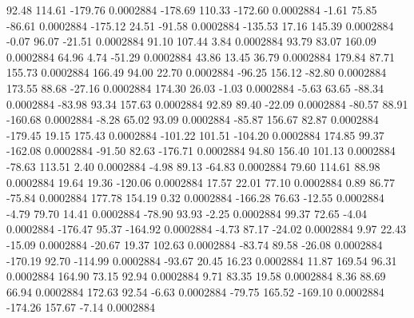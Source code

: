        92.48      114.61     -179.76     0.0002884
     -178.69      110.33     -172.60     0.0002884
       -1.61       75.85      -86.61     0.0002884
     -175.12       24.51      -91.58     0.0002884
     -135.53       17.16      145.39     0.0002884
       -0.07       96.07      -21.51     0.0002884
       91.10      107.44        3.84     0.0002884
       93.79       83.07      160.09     0.0002884
       64.96        4.74      -51.29     0.0002884
       43.86       13.45       36.79     0.0002884
      179.84       87.71      155.73     0.0002884
      166.49       94.00       22.70     0.0002884
      -96.25      156.12      -82.80     0.0002884
      173.55       88.68      -27.16     0.0002884
      174.30       26.03       -1.03     0.0002884
       -5.63       63.65      -88.34     0.0002884
      -83.98       93.34      157.63     0.0002884
       92.89       89.40      -22.09     0.0002884
      -80.57       88.91     -160.68     0.0002884
       -8.28       65.02       93.09     0.0002884
      -85.87      156.67       82.87     0.0002884
     -179.45       19.15      175.43     0.0002884
     -101.22      101.51     -104.20     0.0002884
      174.85       99.37     -162.08     0.0002884
      -91.50       82.63     -176.71     0.0002884
       94.80      156.40      101.13     0.0002884
      -78.63      113.51        2.40     0.0002884
       -4.98       89.13      -64.83     0.0002884
       79.60      114.61       88.98     0.0002884
       19.64       19.36     -120.06     0.0002884
       17.57       22.01       77.10     0.0002884
        0.89       86.77      -75.84     0.0002884
      177.78      154.19        0.32     0.0002884
     -166.28       76.63      -12.55     0.0002884
       -4.79       79.70       14.41     0.0002884
      -78.90       93.93       -2.25     0.0002884
       99.37       72.65       -4.04     0.0002884
     -176.47       95.37     -164.92     0.0002884
       -4.73       87.17      -24.02     0.0002884
        9.97       22.43      -15.09     0.0002884
      -20.67       19.37      102.63     0.0002884
      -83.74       89.58      -26.08     0.0002884
     -170.19       92.70     -114.99     0.0002884
      -93.67       20.45       16.23     0.0002884
       11.87      169.54       96.31     0.0002884
      164.90       73.15       92.94     0.0002884
        9.71       83.35       19.58     0.0002884
        8.36       88.69       66.94     0.0002884
      172.63       92.54       -6.63     0.0002884
      -79.75      165.52     -169.10     0.0002884
     -174.26      157.67       -7.14     0.0002884
